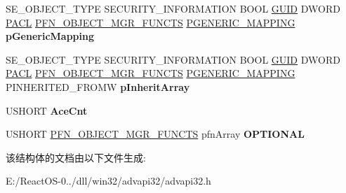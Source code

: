 \begin{DoxyCompactItemize}
$$\item 
\mbox{\label{struct___n_t_m_a_r_t_a_a5949c961a6cab40114f4af911da0b8ba}} 
S\+E\+\_\+\+O\+B\+J\+E\+C\+T\+\_\+\+T\+Y\+PE S\+E\+C\+U\+R\+I\+T\+Y\+\_\+\+I\+N\+F\+O\+R\+M\+A\+T\+I\+ON B\+O\+OL \hyperlink{interface_g_u_i_d}{G\+U\+ID} D\+W\+O\+RD \hyperlink{struct___a_c_l}{P\+A\+CL} \hyperlink{struct___f_n___o_b_j_e_c_t___m_g_r___f_u_n_c_t_i_o_n_s}{P\+F\+N\+\_\+\+O\+B\+J\+E\+C\+T\+\_\+\+M\+G\+R\+\_\+\+F\+U\+N\+C\+TS} \hyperlink{struct___g_e_n_e_r_i_c___m_a_p_p_i_n_g}{P\+G\+E\+N\+E\+R\+I\+C\+\_\+\+M\+A\+P\+P\+I\+NG} {\bfseries p\+Generic\+Mapping}
\item 
\mbox{\label{struct___n_t_m_a_r_t_a_a99651276d2d357d834b7593d54dfe33a}} 
S\+E\+\_\+\+O\+B\+J\+E\+C\+T\+\_\+\+T\+Y\+PE S\+E\+C\+U\+R\+I\+T\+Y\+\_\+\+I\+N\+F\+O\+R\+M\+A\+T\+I\+ON B\+O\+OL \hyperlink{interface_g_u_i_d}{G\+U\+ID} D\+W\+O\+RD \hyperlink{struct___a_c_l}{P\+A\+CL} \hyperlink{struct___f_n___o_b_j_e_c_t___m_g_r___f_u_n_c_t_i_o_n_s}{P\+F\+N\+\_\+\+O\+B\+J\+E\+C\+T\+\_\+\+M\+G\+R\+\_\+\+F\+U\+N\+C\+TS} \hyperlink{struct___g_e_n_e_r_i_c___m_a_p_p_i_n_g}{P\+G\+E\+N\+E\+R\+I\+C\+\_\+\+M\+A\+P\+P\+I\+NG} P\+I\+N\+H\+E\+R\+I\+T\+E\+D\+\_\+\+F\+R\+O\+MW {\bfseries p\+Inherit\+Array}
\item 
\mbox{\label{struct___n_t_m_a_r_t_a_a9513b4369944827d856dc651eef99393}} 
U\+S\+H\+O\+RT {\bfseries Ace\+Cnt}
\item 
\mbox{\label{struct___n_t_m_a_r_t_a_aed390d6f899008e32d75523e415d1ddc}} 
U\+S\+H\+O\+RT \hyperlink{struct___f_n___o_b_j_e_c_t___m_g_r___f_u_n_c_t_i_o_n_s}{P\+F\+N\+\_\+\+O\+B\+J\+E\+C\+T\+\_\+\+M\+G\+R\+\_\+\+F\+U\+N\+C\+TS} pfn\+Array {\bfseries O\+P\+T\+I\+O\+N\+AL}
\end{DoxyCompactItemize}


该结构体的文档由以下文件生成\+:\begin{DoxyCompactItemize}
\item 
E\+:/\+React\+O\+S-\/0../dll/win32/advapi32/advapi32.\+h\end{DoxyCompactItemize}
